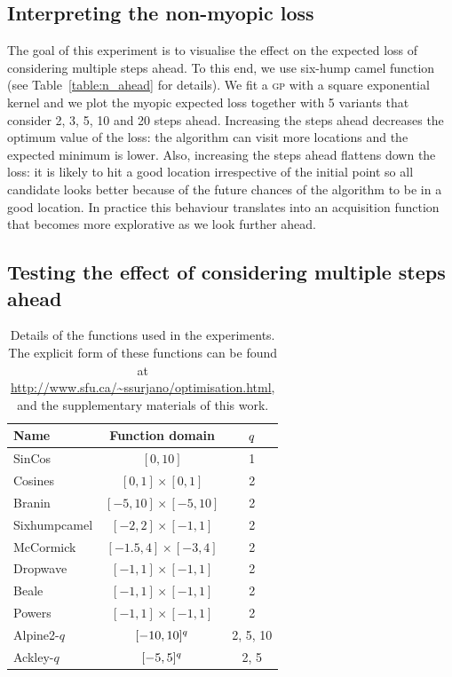 \documentclass[twoside]{article}
\newcommand{\acr}[1]{\textsc{#1}\xspace}
\newcommand{\gp}{\acr{gp}}
\begin{document}
\subsection{Interpreting the non-myopic loss}
The goal of this experiment is to visualise the effect on the expected loss of considering multiple steps ahead. To this end, we use six-hump camel function (see Table~\ref{table:n_ahead} for details). We fit a \gp with a square exponential kernel and we plot the myopic expected loss together with 5 variants that consider 2, 3, 5, 10 and 20 steps ahead. Increasing the steps ahead decreases the optimum value of the loss: the algorithm can visit more locations and the expected minimum is lower. Also, increasing the steps ahead flattens down the loss: it is likely to hit a good location irrespective of the initial point so all candidate looks better because of the future chances of the algorithm to be in a good location. In practice this behaviour translates into an acquisition function that becomes more explorative as we look further ahead. 


\subsection{Testing the effect of considering multiple steps ahead}

\begin{table}[t!]
\begin{center}
\begin{tabular}{lcc}
\toprule
Name &Function domain & $q$ \\
\midrule
SinCos & $[0,10]$ & 1 \\
Cosines & $[0,1]\times[0,1]$ & 2\\
Branin &$[-5,10]\times[-5,10]$ & 2\\
Sixhumpcamel  &$[-2,2]\times[-1,1]$ & 2\\
McCormick  & $[-1.5,4]\times[-3,4]$& 2\\
Dropwave   &$[-1,1]\times[-1,1]$ & 2\\
Beale   &$[-1,1]\times[-1,1]$ & 2\\
Powers  & $[-1,1]\times[-1,1]$& 2\\ %
Alpine2-$q$  & $[-10,10]^{q}$& 2, 5, 10\\
Ackley-$q$  &$[-5,5]^{q}$ & 2, 5\\
\bottomrule
\end{tabular}\caption{Details of the functions used in the experiments. The explicit form of these functions can be found at \url{http://www.sfu.ca/~ssurjano/optimisation.html}, \citep{Molga1995} and the supplementary materials of this work. }\label{table:test_functions}
\end{center}
\end{table}
\end{document}
